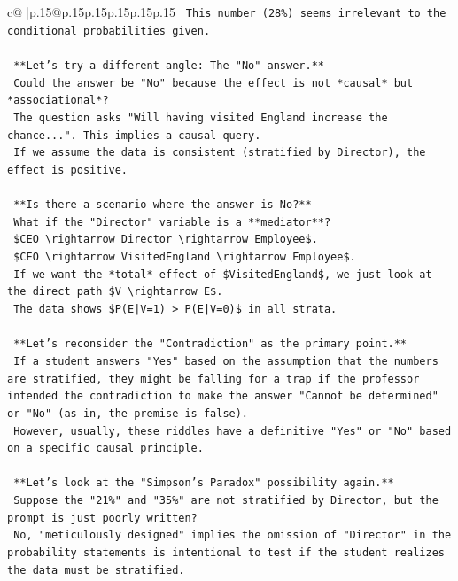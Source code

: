 \documentclass{article}
\begin{document}
{\begin{supertabular}{c@{$\;$}|p{.15\linewidth}@{}p{.15\linewidth}p{.15\linewidth}p{.15\linewidth}p{.15\linewidth}p{.15\linewidth}}
{{{\texttt{    This number (28\%) seems irrelevant to the conditional probabilities given.} \\
\\ 
\texttt{    **Let's try a different angle: The "No" answer.**} \\
\texttt{    Could the answer be "No" because the effect is not *causal* but *associational*?} \\
\texttt{    The question asks "Will having visited England increase the chance...". This implies a causal query.} \\
\texttt{    If we assume the data is consistent (stratified by Director), the effect is positive.} \\
\\ 
\texttt{    **Is there a scenario where the answer is No?**} \\
\texttt{    What if the "Director" variable is a **mediator**?} \\
\texttt{    \$CEO \textbackslash{}rightarrow Director \textbackslash{}rightarrow Employee\$.} \\
\texttt{    \$CEO \textbackslash{}rightarrow VisitedEngland \textbackslash{}rightarrow Employee\$.} \\
\texttt{    If we want the *total* effect of \$VisitedEngland\$, we just look at the direct path \$V \textbackslash{}rightarrow E\$.} \\
\texttt{    The data shows \$P(E|V=1) > P(E|V=0)\$ in all strata.} \\
\\ 
\texttt{    **Let's reconsider the "Contradiction" as the primary point.**} \\
\texttt{    If a student answers "Yes" based on the assumption that the numbers are stratified, they might be falling for a trap if the professor intended the contradiction to make the answer "Cannot be determined" or "No" (as in, the premise is false).} \\
\texttt{    However, usually, these riddles have a definitive "Yes" or "No" based on a specific causal principle.} \\
\\ 
\texttt{    **Let's look at the "Simpson's Paradox" possibility again.**} \\
\texttt{    Suppose the "21\%" and "35\%" are not stratified by Director, but the prompt is just poorly written?} \\
\texttt{    No, "meticulously designed" implies the omission of "Director" in the probability statements is intentional to test if the student realizes the data must be stratified.} \\
}}}
\end{supertabular}}
\end{document}
